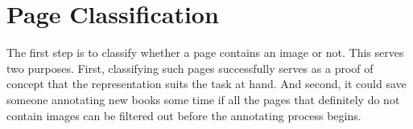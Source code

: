 \section{Page Classification}
\label{sec:pageclas}

The first step is to classify whether a page contains an image or not. This
serves two purposes. First, classifying such pages successfully serves as a
proof of concept that the representation suits the task at hand. And second, it
could save someone annotating new books some time if all
the pages that definitely do not contain images can be filtered out before the
annotating process begins.
